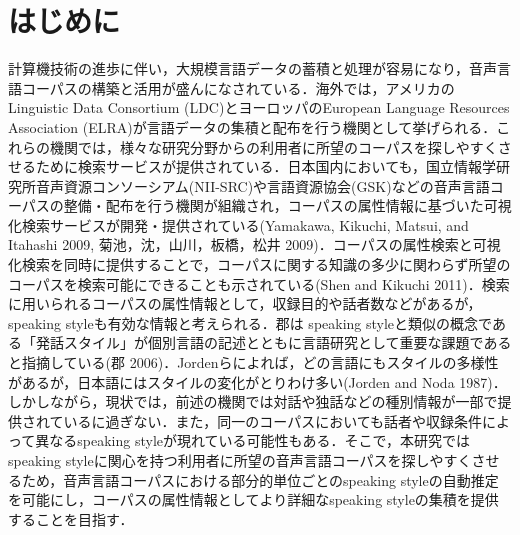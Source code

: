 \documentclass[japanese]{jnlp_1.4}
\begin{document}
\maketitle


\section{はじめに}

計算機技術の進歩に伴い，大規模言語データの蓄積と処理が容易になり，音声言語コーパスの構築と活用が盛んになされている．海外では，アメリカのLinguistic Data Consortium (LDC)とヨーロッパのEuropean Language Resources Association (ELRA)が言語データの集積と配布を行う機関として挙げられる．これらの機関では，様々な研究分野からの利用者に所望のコーパスを探しやすくさせるために検索サービスが提供されている．日本国内においても，国立情報学研究所音声資源コンソーシアム(NII-SRC)や言語資源協会(GSK)などの音声言語コーパスの整備・配布を行う機関が組織され，コーパスの属性情報に基づいた可視化検索サービスが開発・提供されている(Yamakawa, Kikuchi, Matsui, and Itahashi 2009, 菊池，沈，山川，板橋，松井 2009)．コーパスの属性検索と可視化検索を同時に提供することで，コーパスに関する知識の多少に関わらず所望のコーパスを検索可能にできることも示されている(Shen and Kikuchi 2011)．検索に用いられるコーパスの属性情報として，収録目的や話者数などがあるが，speaking styleも有効な情報と考えられる．郡は speaking styleと類似の概念である「発話スタイル」が個別言語の記述とともに言語研究として重要な課題であると指摘している(郡 2006)．Jordenらによれば，どの言語にもスタイルの多様性があるが，日本語にはスタイルの変化がとりわけ多い(Jorden and Noda 1987)．しかしながら，現状では，前述の機関では対話や独話などの種別情報が一部で提供されているに過ぎない．また，同一のコーパスにおいても話者や収録条件によって異なるspeaking styleが現れている可能性もある．そこで，本研究ではspeaking styleに関心を持つ利用者に所望の音声言語コーパスを探しやすくさせるため，音声言語コーパスにおける部分的単位ごとのspeaking styleの自動推定を可能にし，コーパスの属性情報としてより詳細なspeaking styleの集積を提供することを目指す．
\end{document}

